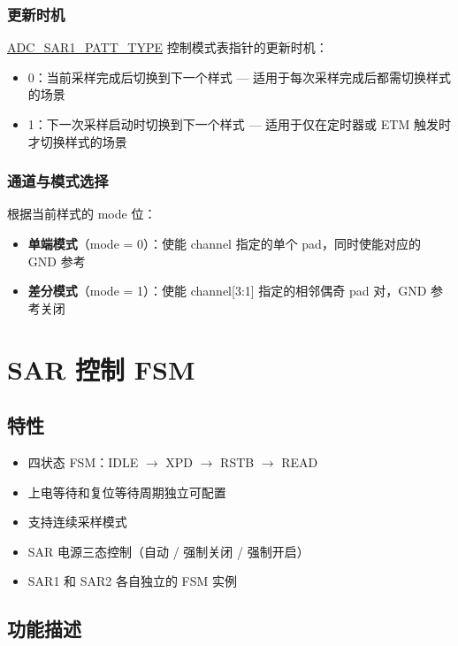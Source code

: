 \documentclass[main\_\_CN.tex]{subfiles}
\begin{document}
\subsubsection{更新时机}
\hyperref[fielddesc:ADCSAR1PATTTYPE]{ADC\_SAR1\_PATT\_TYPE} 控制模式表指针的更新时机：
\begin{itemize}
    \item 0：当前采样完成后切换到下一个样式 — 适用于每次采样完成后都需切换样式的场景
    \item 1：下一次采样启动时切换到下一个样式 — 适用于仅在定时器或 ETM 触发时才切换样式的场景
\end{itemize}

\subsubsection{通道与模式选择}
\label{sec:adc-pattern-mode-channel}
根据当前样式的 mode 位：
\begin{itemize}
    \item \textbf{单端模式}（mode = 0）：使能 channel 指定的单个 pad，同时使能对应的 GND 参考
    \item \textbf{差分模式}（mode = 1）：使能 channel[3:1] 指定的相邻偶奇 pad 对，GND 参考关闭
\end{itemize}


\section{SAR 控制 FSM}
\label{sec:adc-fsm}

\subsection{特性}
\begin{itemize}
    \item 四状态 FSM：IDLE $\to$ XPD $\to$ RSTB $\to$ READ
    \item 上电等待和复位等待周期独立可配置
    \item 支持连续采样模式
    \item SAR 电源三态控制（自动 / 强制关闭 / 强制开启）
    \item SAR1 和 SAR2 各自独立的 FSM 实例
\end{itemize}

\subsection{功能描述}
\label{sec:adc-fsm-func-descr}
\end{document}
